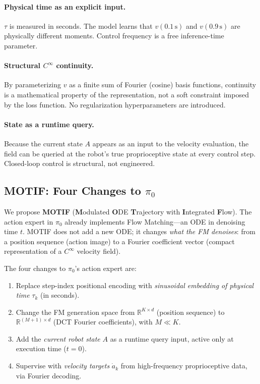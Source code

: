 \documentclass[11pt]{article}
\theoremstyle{plain}
\theoremstyle{definition}
\newcommand{\R}{\mathbb{R}}
\newcommand{\tdiff}{t}
\newcommand{\texec}{\tau}
\begin{document}
\paragraph{Physical time as an explicit input.}
$\texec$ is measured in seconds.
The model learns that $v(0.1\,\text{s})$ and $v(0.9\,\text{s})$ are
physically different moments.
Control frequency is a free inference-time parameter.

\paragraph{Structural $C^\infty$ continuity.}
By parameterizing $v$ as a finite sum of Fourier (cosine) basis functions,
continuity is a mathematical property of the representation, not a soft
constraint imposed by the loss function.
No regularization hyperparameters are introduced.

\paragraph{State as a runtime query.}
Because the current state $A$ appears as an input to the velocity
evaluation, the field can be queried at the robot's true proprioceptive
state at every control step.
Closed-loop control is structural, not engineered.

\subsection{MOTIF: Four Changes to $\pi_0$}

We propose \textbf{MOTIF} (\textbf{M}odulated \textbf{O}DE \textbf{T}rajectory
with \textbf{I}ntegrated \textbf{F}low).
The action expert in $\pi_0$ already implements Flow Matching---an ODE
in denoising time $\tdiff$.
MOTIF does not add a new ODE; it changes \emph{what the FM denoises}:
from a position sequence (action image) to a Fourier coefficient vector
(compact representation of a $C^\infty$ velocity field).

The four changes to $\pi_0$'s action expert are:
\begin{enumerate}[leftmargin=2em,noitemsep]
  \item Replace step-index positional encoding with
    \emph{sinusoidal embedding of physical time} $\texec_k$ (in seconds).
  \item Change the FM generation space from $\R^{K \times d}$ (position
    sequence) to $\R^{(M+1) \times d}$ (DCT Fourier coefficients),
    with $M \ll K$.
  \item Add the \emph{current robot state} $A$ as a runtime query input,
    active only at execution time ($\tdiff = 0$).
  \item Supervise with \emph{velocity targets} $\dot{a}_k$ from
    high-frequency proprioceptive data, via Fourier decoding.
\end{enumerate}
\end{document}
